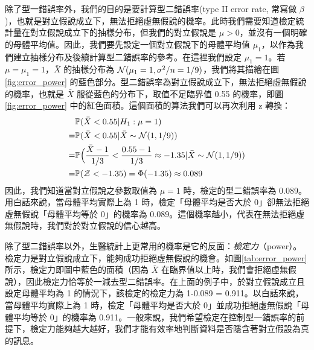     除了型一錯誤率外，我們的目的是要計算型二錯誤率(type II error rate, 常寫做 $\beta$)，也就是對立假說成立下，無法拒絕虛無假說的機率。此時我們需要知道檢定統計量在對立假說成立下的抽樣分布，但我們的對立假說是 $\mu > 0$，並沒有一個明確的母體平均值。因此，我們要先設定一個對立假說下的母體平均值 $\mu_1$，以作為我們建立抽樣分布及後續計算型二錯誤率的參考。在這裡我們設定 $\mu_1 = 1$。若 $\mu = \mu_1 = 1$，$\bar{X}$ 的抽樣分布為 $\mathcal{N}(\mu_1 = 1, \sigma^2/n = 1/9)$，我們將其描繪在圖 \ref{fig:error_power} 的藍色部分。型二錯誤率為對立假說成立下，無法拒絕虛無假說的機率，也就是 $\bar{X}$ 服從藍色的分布下，取值不足臨界值 0.55 的機率，即圖 \ref{fig:error_power} 中的紅色面積。這個面積的算法我們可以再次利用 z 轉換：
    \begin{align*}
        &\mathbb{P}(\bar{X} < 0.55|H_1:\mu = 1) \\
        =& \mathbb{P}(\bar{X} < 0.55|\bar{X} \sim \mathcal{N}(1, 1/9))\\
        =& \mathbb{P}\Big(\frac{\bar{X}-1}{1/3} < \frac{0.55 - 1}{1/3} \approx -1.35|\bar{X} \sim \mathcal{N}(1, 1/9))\\
        =& \mathbb{P}(\mathcal{Z} < -1.35) = \Phi(-1.35) \approx 0.089
    \end{align*}
    因此，我們知道當對立假說之參數取值為 $\mu = 1$ 時，檢定的型二錯誤率為 0.089。用白話來說，當母體平均實際上為 1 時，檢定「母體平均是否大於 0」卻無法拒絕虛無假說「母體平均等於 0」的機率為 0.089。這個機率越小，代表在無法拒絕虛無假說時，我們對於對立假說的信心越高。

    除了型二錯誤率以外，生醫統計上更常用的機率是它的反面：\textit{檢定力}（power）。檢定力是對立假說成立下，能夠成功拒絕虛無假說的機會。如圖\ref{tab:error_power}所示，檢定力即圖中藍色的面積（因為 $\bar{X}$ 在臨界值以上時，我們會拒絕虛無假說），因此檢定力恰等於一減去型二錯誤率。在上面的例子中，於對立假說成立且設定母體平均為 1 的情況下，該檢定的檢定力為 1-0.089 = 0.911。以白話來說，當母體平均實際上為 1 時，檢定「母體平均是否大於 0」並成功拒絕虛無假說「母體平均等於 0」的機率為 0.911。一般來說，我們希望檢定在控制型一錯誤率的前提下，檢定力能夠越大越好，我們才能有效率地判斷資料是否隱含著對立假設為真的訊息。
    
